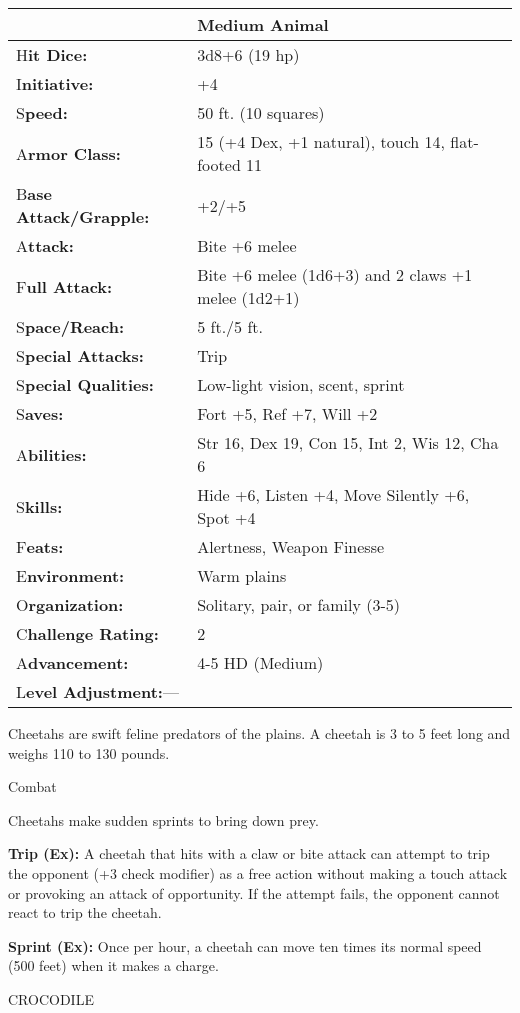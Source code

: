 \documentclass{article}
\begin{document}
\begin{tabular}{|>{\raggedright}p{91pt}|>{\raggedright}p{213pt}|}
\hline
  & Medium Animal\tabularnewline
\hline
H\textbf{it Dice:} & 3d8+6 (19 hp)\tabularnewline
\hline
I\textbf{nitiative:} & +4\tabularnewline
\hline
S\textbf{peed:} & 50 ft. (10 squares)\tabularnewline
\hline
A\textbf{rmor Class:} & 15 (+4 Dex, +1 natural), touch 14, flat-footed 11\tabularnewline
\hline
B\textbf{ase Attack/Grapple:} & +2/+5\tabularnewline
\hline
A\textbf{ttack:} & Bite +6 melee\tabularnewline
\hline
F\textbf{ull Attack:} & Bite +6 melee (1d6+3) and 2 claws +1 melee (1d2+1)\tabularnewline
\hline
S\textbf{pace/Reach:} & 5 ft./5 ft.\tabularnewline
\hline
S\textbf{pecial Attacks:} & Trip\tabularnewline
\hline
S\textbf{pecial Qualities:} & Low-light vision, scent, sprint\tabularnewline
\hline
S\textbf{aves:} & Fort +5, Ref +7, Will +2\tabularnewline
\hline
A\textbf{bilities:} & Str 16, Dex 19, Con 15, Int 2, Wis 12, Cha 6\tabularnewline
\hline
S\textbf{kills:} & Hide +6, Listen +4, Move Silently +6, Spot +4\tabularnewline
\hline
F\textbf{eats:} & Alertness, Weapon Finesse\tabularnewline
\hline
E\textbf{nvironment:} & Warm plains\tabularnewline
\hline
O\textbf{rganization:} & Solitary, pair, or family (3-5)\tabularnewline
\hline
C\textbf{hallenge Rating:} & 2\tabularnewline
\hline
A\textbf{dvancement:} & 4-5 HD (Medium)\tabularnewline
\hline
L\textbf{evel Adjustment:}--- & \tabularnewline
\hline
\end{tabular}

Cheetahs are swift feline predators of the plains. A cheetah is 3 to 5 feet long 
and weighs 110 to 130 pounds.

Combat

Cheetahs make sudden sprints to bring down prey.

\textbf{Trip (Ex): }A cheetah that hits with a claw or bite attack can attempt 
to trip the opponent (+3 check modifier) as a free action without making a touch 
attack or provoking an attack of opportunity. If the attempt fails, the opponent 
cannot react to trip the cheetah.

\textbf{Sprint (Ex): }Once per hour, a cheetah can move ten times its normal speed 
(500 feet) when it makes a charge.

\vspace{12pt}
CROCODILE
\end{document}
